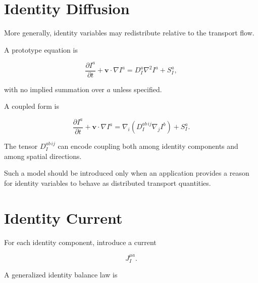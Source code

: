 \documentclass[12pt,oneside]{book}
\begin{document}

\section{Identity Diffusion}
\label{sec:identity-diffusion}

More generally, identity variables may redistribute relative to
the transport flow.

A prototype equation is

\begin{equation}
    \frac{\partial I^a}{\partial t}
    +
    \mathbf{v}\cdot\nabla I^a
    =
    D_I^{a}
    \nabla^2 I^a
    +
    S_I^a,
    \label{eq:identity-advection-diffusion}
\end{equation}

with no implied summation over \(a\) unless specified.

A coupled form is

\begin{equation}
    \frac{\partial I^a}{\partial t}
    +
    \mathbf{v}\cdot\nabla I^a
    =
    \nabla_i
    \left(
        D^{ab\,ij}_I
        \nabla_j I^b
    \right)
    +
    S_I^a.
    \label{eq:coupled-identity-diffusion}
\end{equation}

The tensor \(D^{ab\,ij}_I\) can encode coupling both among
identity components and among spatial directions.

Such a model should be introduced only when an application
provides a reason for identity variables to behave as
distributed transport quantities.


\section{Identity Current}
\label{sec:identity-current}

For each identity component, introduce a current

\begin{equation}
    J_I^{\mu a}.
    \label{eq:identity-current}
\end{equation}

A generalized identity balance law is
\end{document}
